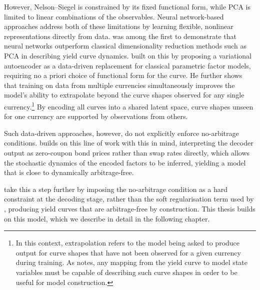 However, Nelson--Siegel is constrained by its fixed functional form, while PCA is limited to linear combinations of the observables. Neural network-based approaches address both of these limitations by learning flexible, nonlinear representations directly from data. \citet{Kondratyev2018} was among the first to demonstrate that neural networks outperform classical dimensionality reduction methods such as PCA in describing yield curve dynamics. \citet{Sokol2022} built on this by proposing a variational autoencoder as a data-driven replacement for classical parametric factor models, requiring no a priori choice of functional form for the curve. He further shows that training on data from multiple currencies simultaneously improves the model's ability to extrapolate beyond the curve shapes observed for any single currency.\footnote{In this context, extrapolation refers to the model being asked to produce output for curve shapes that have not been observed for a given currency during training. As \citet{Sokol2022} notes, any mapping from the yield curve to model state variables must be capable of describing such curve shapes in order to be useful for model construction.} By encoding all curves into a shared latent space, curve shapes unseen for one currency are supported by observations from others.

Such data-driven approaches, however, do not explicitly enforce no-arbitrage conditions. \citet{Andreasen2023} builds on this line of work with this in mind, interpreting the decoder output as zero-coupon bond prices rather than swap rates directly, which allows the stochastic dynamics of the encoded factors to be inferred, yielding a model that is close to dynamically arbitrage-free.

\citet{MatinWanPoulsen2025} take this a step further by imposing the no-arbitrage condition as a hard constraint at the decoding stage, rather than the soft regularisation term used by \citet{Andreasen2023}, producing yield curves that are arbitrage-free by construction. This thesis builds on this model, which we describe in detail in the following chapter.







